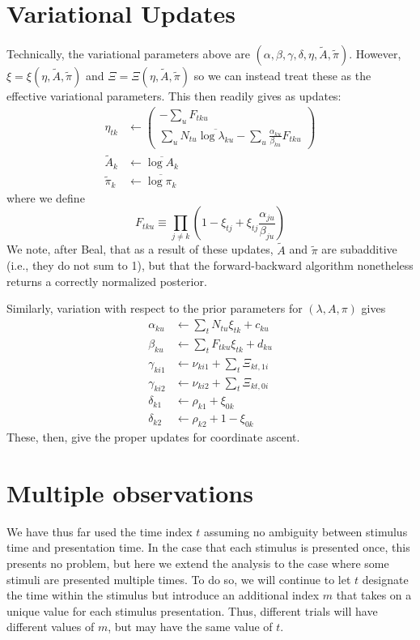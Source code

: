 \documentclass[11pt]{article}
\begin{document}
\section{Variational Updates}
Technically, the variational parameters above are $(\alpha, \beta, \gamma, \delta, \eta, \tilde{A}, \tilde{\pi})$. However, $\xi = \xi(\eta, \tilde{A}, \tilde{\pi})$ and $\Xi = \Xi(\eta, \tilde{A}, \tilde{\pi})$ so we can instead treat these as the effective variational parameters. This then readily gives as updates:
\begin{align}
    \eta_{tk} &\leftarrow 
    \begin{pmatrix}
        -\sum_u F_{tku} \\
        \sum_u N_{tu} \overline{\log \lambda_{ku}} -
        \sum_u \frac{\alpha_{ku}}{\beta_{ku}} F_{tku} 
    \end{pmatrix} \\
    \tilde{A}_{k} &\leftarrow \overline{\log A_k} \\
    \tilde{\pi}_k &\leftarrow \overline{\log \pi_k}
\end{align}
where we define
\begin{equation}
    F_{tku} \equiv \prod_{j \neq k} \left( 1 - \xi_{tj} + \xi_{tj} \frac{\alpha_{ju}}{\beta_{ju}}\right)
\end{equation}
We note, after Beal, that as a result of these updates, $\tilde{A}$ and $\tilde{\pi}$ are subadditive (i.e., they do not sum to 1), but that the forward-backward algorithm nonetheless returns a correctly normalized posterior.


Similarly, variation with respect to the prior parameters for $(\lambda, A, \pi)$ gives
\begin{align}
    \alpha_{ku} &\leftarrow \sum_t N_{tu} \xi_{tk} + c_{ku} \\
    \beta_{ku} &\leftarrow \sum_t F_{tku}\xi_{tk} + d_{ku} \\
    \gamma_{ki1} &\leftarrow \nu_{ki1} + \sum_t \Xi_{kt, 1i} \\
    \gamma_{ki2} &\leftarrow \nu_{ki2} + \sum_t \Xi_{kt, 0i} \\
    \delta_{k1} &\leftarrow \rho_{k1} + \xi_{0k} \\
    \delta_{k2} &\leftarrow \rho_{k2} + 1 - \xi_{0k} 
\end{align}
These, then, give the proper updates for coordinate ascent.

\section{Multiple observations}
We have thus far used the time index $t$ assuming no ambiguity between stimulus time and presentation time. In the case that each stimulus is presented once, this presents no problem, but here we extend the analysis to the case where some stimuli are presented multiple times. To do so, we will continue to let $t$ designate the time within the stimulus but introduce an additional index $m$ that takes on a unique value for each stimulus presentation. Thus, different trials will have different values of $m$, but may have the same value of $t$.
\end{document}
